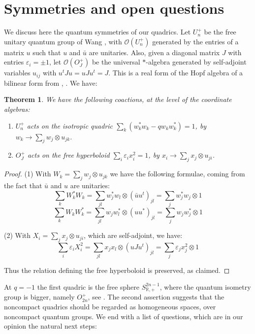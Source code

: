\documentclass[11pt]{amsart}
\newtheorem{theorem}{Theorem}[section]
\theoremstyle{definition}
\begin{document}
\section{Symmetries and open questions}

We discuss here the quantum symmetries of our quadrics. Let $U_n^+$ be the free unitary quantum group of Wang \cite{wan}, with $\mathcal O(U_n^+)$ generated by the entries of a matrix $u$ such that $u$ and $\bar u$ are unitaries. Also, given a diagonal matrix $J$ with entries $\varepsilon_i=\pm1$, let $\mathcal O(O_J^+)$ be the universal $*$-algebra generated by self-adjoint variables $u_{ij}$ with $u^tJu=uJu^t=J$. This is a real form of the Hopf algebra of a bilinear form from \cite{bic}, \cite{dla}. We have:

\begin{theorem}
We have the following coactions, at the level of the coordinate algebras:
\begin{enumerate}
\item $U_n^+$ acts on the isotropic quadric $\sum_k(w_k^*w_k-qw_kw_k^*)=1$, by $w_k\to\sum_jw_j\otimes u_{jk}$.

\item $O_J^+$ acts on the free hyperboloid $\sum_i\varepsilon_ix_i^2=1$, by $x_i\to\sum_jx_j\otimes u_{ji}$.
\end{enumerate}
\end{theorem}

\begin{proof}
(1) With $W_k=\sum_jw_j\otimes u_{jk}$ we have the following formulae, coming from the fact that $\bar u$ and $u$ are unitaries:
$$\sum_kW_k^*W_k=\sum_{jl}w_j^*w_l\otimes(\bar uu^t)_{jl}=\sum_jw_j^*w_j\otimes1$$
$$\sum_kW_kW_k^*=\sum_{jl}w_jw_l^*\otimes(uu^*)_{jl}=\sum_jw_jw_j^*\otimes1$$

(2) With $X_i=\sum_jx_j\otimes u_{ji}$, which are self-adjoint, we have:
$$\sum_i\varepsilon_iX_i^2=\sum_{jl}x_jx_l\otimes(uJu^t)_{jl}=\sum_j\varepsilon_jx_j^2\otimes1$$

Thus the relation defining the free hyperboloid is preserved, as claimed.
\end{proof}

At $q=-1$ the first quadric is the free sphere $S^{2n-1}_{\mathbb R,+}$, where the quantum isometry group is bigger, namely $O_{2n}^+$, see \cite{bgo}. The second assertion suggests that the noncompact quadrics should be regarded as homogeneous spaces, over noncompact quantum groups. We end with a list of questions, which are in our opinion the natural next steps:
\end{document}
